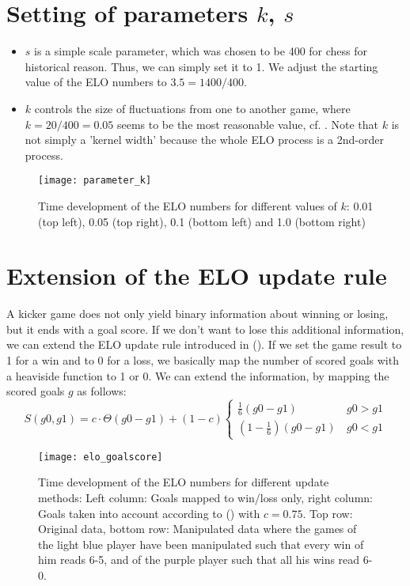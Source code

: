 \documentclass[a4paper,10pt]{article}
\begin{document}
\section{Setting of parameters $k$, $s$}
\label{sec:calibration}
\begin{itemize}
\item $s$ is a simple scale parameter, which was chosen to be 400 for chess for historical reason. Thus, we can simply set it to 1. We adjust the starting value of the ELO numbers to $3.5=1400/400$.
\item $k$ controls the size of fluctuations from one to another game, where $k=20/400=0.05$ seems to be the most reasonable value, cf. . Note that $k$ is not simply a 'kernel width' because the whole ELO process is a 2nd-order process.
\end{itemize}

\begin{figure}
\texttt{[image: parameter\_k]}
    \caption{Time development of the ELO numbers for different values of $k$: 0.01 (top left), 0.05 (top right), 0.1 (bottom left) and 1.0 (bottom right)}
  \label{fig:parameter_k}
\end{figure}

\section{Extension of the ELO update rule}
A kicker game does not only yield binary information about winning or losing, but it ends with a goal score. If we don't want to lose this additional information, we can extend the ELO update rule introduced in ().
If we set the game result to 1 for a win and to 0 for a loss, we basically map the number of scored goals with a heaviside function to 1 or 0. We can extend the information, by mapping the scored goals $g$ as follows:
\begin{equation}
  S(g0, g1) = c \cdot \Theta(g0 - g1) + (1-c) 
\begin{cases}
    \frac{1}{6} \left( g0-g1 \right) \, &g0>g1 \\
(1-\frac{1}{6}) \left( g0-g1 \right) \, &g0<g1
\end{cases}
\label{eq:goal_mapping}
\end{equation}

\begin{figure}
\texttt{[image: elo\_goalscore]}
    \caption{Time development of the ELO numbers for different update methods: Left column: Goals mapped to win/loss only, right column: Goals taken into account according to () with $c=0.75$. Top row: Original data, bottom row: Manipulated data where the games of the light blue player have been manipulated such that every win of him reads 6-5, and of the purple player such that all his wins read 6-0.}
  \label{fig:elo_goalscore}
\end{figure}
\end{document}

